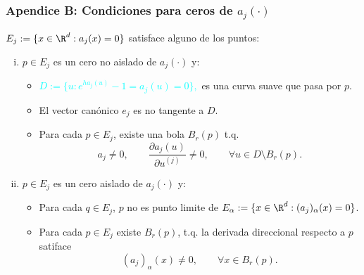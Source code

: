 \begin{frame}[noframenumbering]
	\frametitle{Apendice B: Condiciones para ceros de $a_j(\cdot)$}    
		\textcolor{orange}{
			 $E_j:=\{x\in \R^{d}: a_j(x)=0\}$
		} satisface alguno de los puntos:
		\begin{enumerate}[(i)]
			\item
				 $p \in E_j$ es un cero no aislado de  $a_j(\cdot)$ y:
			\begin{itemize}
				\item  
					\textcolor{cyan}{
					$
						D:=\{u: e^{ha_j(u)}-1=a_j(u)= 0\},
					$ 
				}
				es una curva suave que pasa por $p$. 
				\item
				El vector canónico $e_j$ es no tangente a $D$.
				\item
					Para cada $p \in E_j$, existe una bola $B_r(p)$ t.q.
				$$
					a_j\neq 0, \qquad
					\frac{\partial a_j(u)}{\partial u^{(j)}} \neq 0 ,\qquad 
					\forall u \in D
					\setminus B_r(p).
				$$
			\end{itemize}	
			\item
				 $p \in E_j$ es un cero aislado de $a_j(\cdot)$ y:
			\begin{itemize}
				\item
					Para cada $q\in E_j$,  $p$ no es punto limite de
					$E_{\alpha}:=\{x \in \R^d: (a_j)_\alpha(x)=0\}$.
				\item
					Para cada $p \in E_j$ existe  $B_r(p)$, t.q.
					la derivada direccional respecto a $p$ satiface
				$$
				(a_j)_\alpha(x) \neq 0, \qquad \forall x\in B_r(p).
				$$
			\end{itemize}		
		\end{enumerate}
\end{frame}

